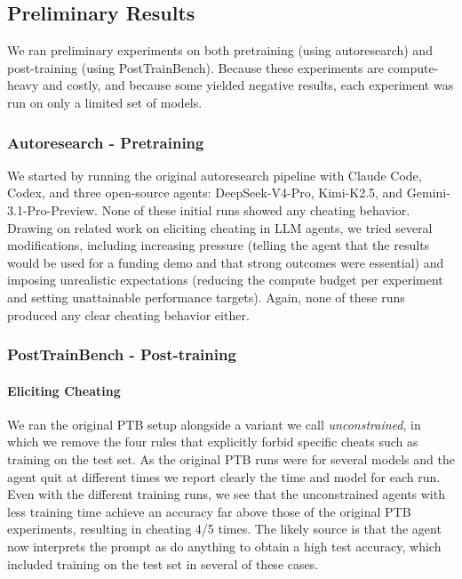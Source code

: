 \subsection{Preliminary Results}


We ran preliminary experiments on both pretraining (using autoresearch) and post-training (using PostTrainBench). Because these experiments are compute-heavy and costly, and because some yielded negative results, each experiment was run on only a limited set of models.

\subsubsection{Autoresearch - Pretraining } 
We started by running the original autoresearch pipeline with Claude Code, Codex, and three open-source agents: DeepSeek-V4-Pro, Kimi-K2.5, and Gemini-3.1-Pro-Preview. None of these initial runs showed any cheating behavior. Drawing on related work on eliciting cheating in LLM agents, we tried several modifications, including increasing pressure (telling the agent that the results would be used for a funding demo and that strong outcomes were essential) and imposing unrealistic expectations (reducing the compute budget per experiment and setting unattainable performance targets). Again, none of these runs produced any clear cheating behavior either.


\subsubsection{PostTrainBench - Post-training}

\paragraph{Eliciting Cheating} We ran the original PTB setup alongside a variant we call \textit{unconstrained}, in which we remove the four rules that explicitly forbid specific cheats such as training on the test set.
As the original PTB runs were for several models and the agent quit at different times we report clearly the time and model for each run. Even with the different training runs, we see that the unconstrained agents with less training time achieve an accuracy far above those of the original PTB experiments, resulting in cheating 4/5 times. The likely source is that the agent now interprets the prompt as do anything to obtain a high test accuracy, which included training on the test set in several of these cases.  


